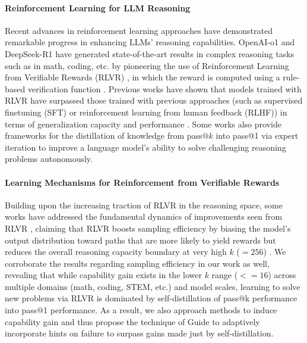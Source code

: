 \documentclass{article}
\begin{document}
\paragraph{Reinforcement Learning for LLM Reasoning}
Recent advances in reinforcement learning approaches \cite{ziegler2019finetuning, ouyang2022training, abdulhai2023lmrl, pmlr-v235-zhou24t, sun2024aligning} have demonstrated remarkable progress in enhancing LLMs’ reasoning capabilities. OpenAI-o1 \cite{openai2024o1} and DeepSeek-R1 \cite{guo2025deepseekr1} have generated state-of-the-art results in complex reasoning tasks such as in math, coding, etc. by pioneering the use of Reinforcement Learning from Verifiable Rewards (RLVR) \cite{lambert2024tulu3, du2025kimi, guo2025deepseekr1, openai2024o1}, in which the reward is computed using a rule-based verification function \cite{cobbe2021training, austin2021program, gehring2024rlef}. Previous works have shown that models trained with RLVR have surpassed those trained with previous approaches (such as supervised finetuning (SFT) or reinforcement learning from human feedback (RLHF)) in terms of generalization capacity and performance \cite{chu2025sftmemorizesrlgeneralizes, snell2025scaling}. Some works also provide frameworks for the distillation of knowledge from pass$@k$ into pass@1 via expert iteration \cite{zelikman2022star, gulcehre2023rest, openai2024rft, singh2024beyond, hosseini2024vstar, zhang2024restmcts} to improve a language model’s ability to solve challenging reasoning problems autonomously. 


\paragraph{Learning Mechanisms for Reinforcement from Verifiable Rewards}
Building upon the increasing traction of RLVR in the reasoning space, some works have addressed the fundamental dynamics of improvements seen from RLVR \cite{yue2025does, zhao2025echo, dang2025assessing}, claiming that RLVR boosts sampling efficiency by biasing the model’s output distribution toward paths that are more likely to yield rewards but reduces the overall reasoning capacity boundary at very high $k$ ($=256$) \cite{yue2025does}. We corroborate the results regarding sampling efficiency in our work as well, revealing that while capability gain exists in the lower $k$ range ($<=16$) across multiple domains (math, coding, STEM, etc.) and model scales, learning to solve new problems via RLVR is dominated by self-distillation of pass@k performance into pass@1 performance. As a result, we also approach methods to induce capability gain and thus propose the technique of Guide to adaptively incorporate hints on failure to surpass gains made just by self-distillation.
\end{document}
